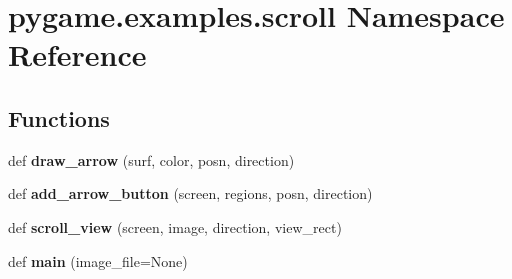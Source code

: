 \hypertarget{namespacepygame_1_1examples_1_1scroll}{}\section{pygame.\+examples.\+scroll Namespace Reference}
\label{namespacepygame_1_1examples_1_1scroll}
\subsection*{Functions}
\begin{DoxyCompactItemize}
\item 
\mbox{\label{namespacepygame_1_1examples_1_1scroll_a0629752a1c62604fc80a77b7ff2bee52}} 
def {\bfseries draw\+\_\+arrow} (surf, color, posn, direction)
\item 
\mbox{\label{namespacepygame_1_1examples_1_1scroll_a0d9a7f950394b8c6d7a3216153d2a214}} 
def {\bfseries add\+\_\+arrow\+\_\+button} (screen, regions, posn, direction)
\item 
\mbox{\label{namespacepygame_1_1examples_1_1scroll_a971616c98db81ed4bec3e141c9ef42fa}} 
def {\bfseries scroll\+\_\+view} (screen, image, direction, view\+\_\+rect)
\item 
\mbox{\label{namespacepygame_1_1examples_1_1scroll_a72e0f5b6a78f5909d6524bf5cdc8debe}} 
def {\bfseries main} (image\+\_\+file=None)
\end{DoxyCompactItemize}
